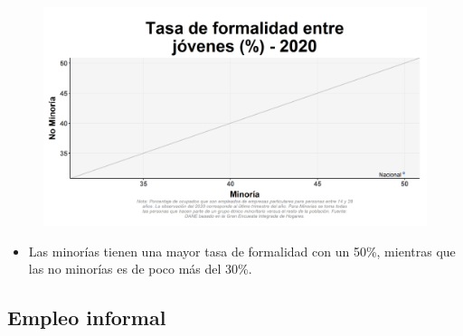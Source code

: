     \begin{figure}[H]
        \caption[Tasa de formalidad entre jóvenes por minorías y no minorías para 2020 ]{\label{formaljov_minoria_scatter} }
        \begin{center}
        \includegraphics[width=\textwidth,keepaspectratio]{img/var_64_scatter.png}
        \end{center}
    \end{figure}
            \begin{itemize}
                \item Las minorías tienen una mayor tasa de formalidad con un 50\%, mientras que las no minorías es de poco más del 30\%.
                \end{itemize}

    \subsection{Empleo informal}

